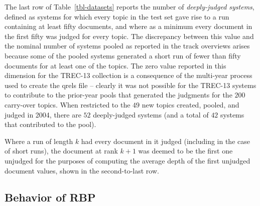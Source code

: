 The last row of Table~\ref{tbl-datasets} reports the number of
{\emph{deeply-judged systems}}, defined as systems for which every
topic in the test set gave rise to a run containing at least fifty
documents, and where as a minimum every document in the first fifty
was judged for every topic.
The discrepancy between this value and the nominal number of systems
pooled as reported in the track overviews
{\citep{vh98trec,vh99trec,voorhees04trecrobust}} arises because some
of the pooled systems generated a short run of fewer than fifty
documents for at least one of the topics.
The zero value reported in this dimension for the TREC-13 collection
is a consequence of the multi-year process used to create the qrels
file -- clearly it was not possible for the TREC-13 systems to
contribute to the prior-year pools that generated the judgments for
the $200$ carry-over topics.
When restricted to the $49$ new topics created, pooled, and judged in
2004, there are $52$ deeply-judged systems (and a total of $42$ systems
that contributed to the pool).

Where a run of length $k$ had every document in it judged (including
in the case of short runs), the document at rank $k+1$ was deemed to
be the first one unjudged for the purposes of computing the average
depth of the first unjudged document values, shown in the
second-to-last row.

\subsection{Behavior of RBP}

